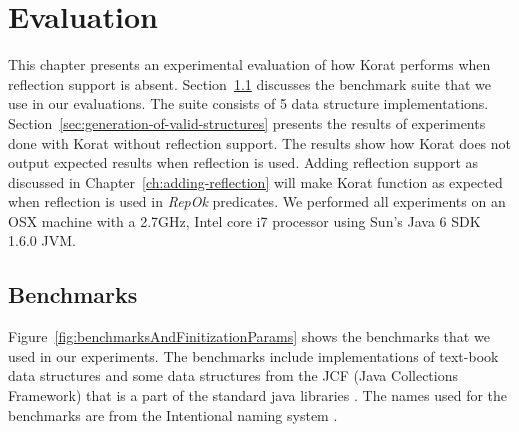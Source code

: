 \begin{comment}
sorted list
boolean repOk() {
    boolean b = acyclicAndSizeok(); // inline -- non-shortcircuiting
    if (!b) return false;
    boolean c = sorted(); // inline -- non-shortcircuiting
    return c;
}

red-black tree
boolean repOk() {
    boolean b = acyclicAndSizeok(); // inline -- non-shortcircuiting
    if (!b) return false;
    boolean c = colorOK(); // inline -- non-shortcircuiting
    boolean d = bst(); // inline -- non-shortcircuiting
    return c && d;
}
\end{comment}

\chapter{Evaluation}
\label{ch:evaluation}
This chapter presents an experimental evaluation of how Korat performs when
reflection support is absent. Section~\ref{sec:benchmarks} discusses
the benchmark suite that we use in our evaluations. The suite consists
of 5 data structure
implementations. Section~\ref{sec:generation-of-valid-structures}
presents the results of experiments done with Korat without reflection
support. The results show how Korat does not output expected results
when reflection is used. Adding reflection support as discussed in
Chapter~\ref{ch:adding-reflection} will make Korat function as
expected when reflection is used in \emph{RepOk} predicates. We
performed all experiments on an OSX machine with a 2.7GHz, Intel core
i7 processor using Sun’s Java 6 SDK 1.6.0 JVM.



\section{Benchmarks}
\label{sec:benchmarks}
Figure~\ref{fig:benchmarksAndFinitizationParams} shows the benchmarks
that we used in our experiments. The benchmarks include
implementations of text-book data structures and some data structures
from the JCF (Java Collections Framework) that is a part of the
standard java libraries \cite{Linden:2004:JJJ:993931}. The names used for the benchmarks
are from the Intentional naming system \cite{adjie1999design}.

